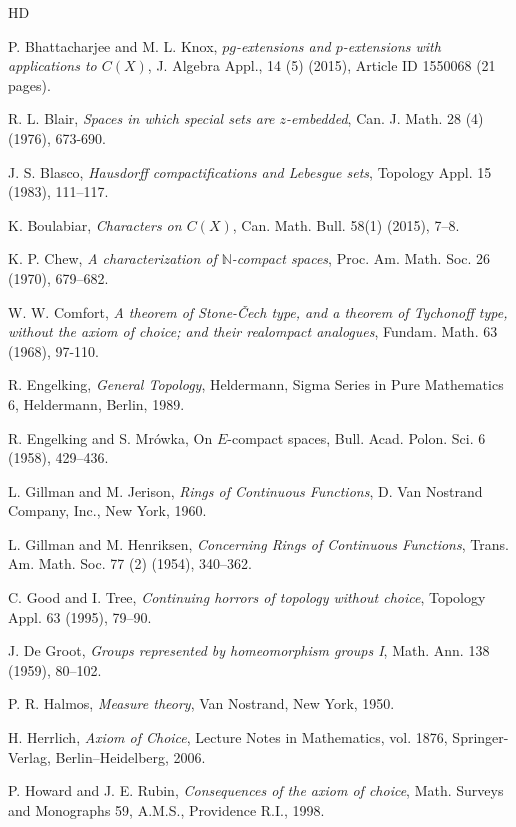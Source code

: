 \documentclass[12pt,twoside,leqno]{article}
\theoremstyle{plain}
\theoremstyle{definition}
\theoremstyle{remark}
\begin{document}
\begin{thebibliography}{HD}

 P. Bhattacharjee and M. L. Knox, {\it $pg$-extensions and $p$-extensions with applications to $C(X)$}, J. Algebra Appl., 14 (5) (2015), Article ID 1550068 (21 pages).

 R. L. Blair, {\it Spaces in which special sets are $z$-embedded}, Can. J. Math. 28 (4) (1976), 673-690.

 J. S. Blasco, {\it Hausdorff compactifications and Lebesgue sets}, Topology Appl. 15 (1983), 111--117.

  K. Boulabiar, {\it Characters on $C(X)$}, Can. Math. Bull. 58(1) (2015), 7--8.

 K. P. Chew, {\it A characterization of $\mathbb{N}$-compact spaces}, Proc. Am. Math. Soc. 26 (1970), 679--682.

 W. W. Comfort, {\it A theorem of Stone-\v Cech type, and a theorem of Tychonoff type, without the axiom of choice; and their realompact analogues}, Fundam. Math. 63 (1968), 97-110.

 R. Engelking, {\it General Topology}, Heldermann, Sigma Series in Pure Mathematics 6, Heldermann, Berlin, 1989.

 R. Engelking and S. Mr\'owka, On $E$-compact spaces, Bull. Acad. Polon. Sci. 6 (1958), 429--436.

 L. Gillman and M. Jerison, {\it Rings of Continuous Functions}, D. Van Nostrand Company, Inc., New York, 1960.

 L. Gillman and M. Henriksen, {\it Concerning Rings of Continuous Functions}, Trans. Am.  Math. Soc. 77 (2) (1954), 340--362.

 C. Good and I. Tree, {\it Continuing horrors of topology without choice}, Topology Appl. 63 (1995), 79--90.

 J. De Groot, {\it Groups represented by homeomorphism groups I}, Math. Ann. 138 (1959), 80--102.

 P. R. Halmos, {\it Measure theory}, Van Nostrand, New York, 1950.

 H. Herrlich, {\it Axiom of Choice}, Lecture Notes in Mathematics, vol. 1876, Springer-Verlag, Berlin–Heidelberg, 2006.

  P. Howard and J. E. Rubin, {\it Consequences of the axiom of choice}, Math. Surveys and Monographs 59, A.M.S., Providence R.I., 1998.


\end{thebibliography}
\end{document}

